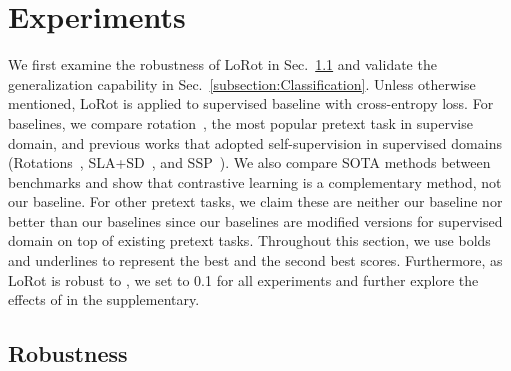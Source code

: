 \section{Experiments}
\label{section:Experiments}
We first examine the robustness of LoRot in Sec.~\ref{subsection:Robustness} and validate the generalization capability in Sec.~\ref{subsection:Classification}. 
Unless otherwise mentioned, LoRot is applied to supervised baseline with cross-entropy loss. 
For baselines, we compare rotation~\cite{gidaris2018unsupervised}, the most popular pretext task in supervise domain, and previous works that adopted self-supervision in supervised domains (Rotations~\cite{hendrycks2019using}, SLA+SD~\cite{lee2020self}, and SSP~\cite{yang2020rethinking}).
We also compare SOTA methods between benchmarks and show that contrastive learning is a complementary method, not our baseline.
For other pretext tasks, we claim these are neither our baseline nor better than our baselines since our baselines are modified versions for supervised domain on top of existing pretext tasks.
Throughout this section, we use bolds and underlines to represent the best and the second best scores.
Furthermore, as LoRot is robust to , we set  to 0.1 for all experiments and further explore the effects of  in the supplementary.


\subsection{Robustness}
\label{subsection:Robustness}






